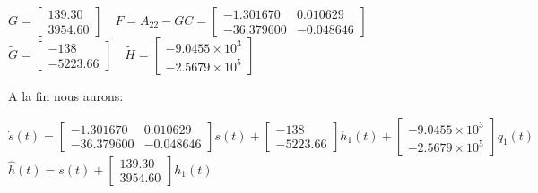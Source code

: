 		\begin{center}
		
			$G= \begin{bmatrix} 139.30\\3954.60 \end{bmatrix} \quad F=A_{22}-GC= \begin{bmatrix} -1.301670&0.010629\\-36.379600&-0.048646 \end{bmatrix}$	\\[0.25cm]
			$\tilde{G}= \begin{bmatrix} -138\\-5223.66 \end{bmatrix} \quad \tilde{H}= \begin{bmatrix} -9.0455 \times 10^{3} \\ -2.5679 \times 10^{5} \end{bmatrix}  $
		
		\end{center}
		
		A la fin nous aurons: 
		
		\begin{center}
	 $\dot s(t)= \begin{bmatrix} -1.301670&0.010629\\-36.379600&-0.048646 \end{bmatrix} s(t) + \begin{bmatrix} -138\\-5223.66 \end{bmatrix} h_1(t)+ \begin{bmatrix} -9.0455 \times 10^{3} \\ -2.5679 \times 10^{5} \end{bmatrix} q_1(t)$\\[0.25cm]
	 $\widehat{h}(t)=s(t)+ \begin{bmatrix} 139.30\\ 3954.60 \end{bmatrix} h_1(t)$\\[0.25cm]
	 \end{center}
	 
	 \begin{center}
		\label{fig4}
		\end{center}